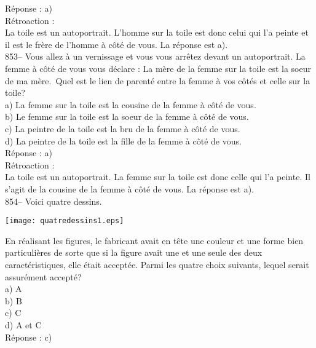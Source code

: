 ﻿\documentclass[letterpaper, 12pt]{article}
\begin{document}
R\'eponse : a)\\

R\'etroaction :\\
La toile est un autoportrait.  L'homme sur la toile est donc celui qui l'a
peinte et il est le fr\`ere de l'homme \`a c\^ot\'e de vous.  La r\'eponse
est a).\\

853-- Vous allez \`a un vernissage et vous vous arr\^etez devant un
autoportrait.  La femme \`a c\^ot\'e de vous vous d\'eclare : \og La
m\`ere de la femme sur la toile est la soeur de ma m\`ere.\fg\  Quel
est le lien de parent\'e entre la femme \`a vos c\^ot\'es et celle sur la toile?\\
a) La femme sur la toile est la cousine de la femme \`a c\^ot\'e de vous.\\
b) Le femme sur la toile est la soeur de la femme \`a c\^ot\'e de vous.\\
c) La peintre de la toile est la bru de la femme \`a c\^ot\'e de vous.\\
d) La peintre de la toile est la fille de la femme \`a c\^ot\'e de vous.\\

R\'eponse : a)\\

R\'etroaction : \\
La toile est un autoportrait.  La femme sur la toile est donc celle qui l'a
peinte.  Il s'agit de la cousine de la femme \`a c\^ot\'e de vous.  La
r\'eponse est a).\\

854-- Voici quatre dessins.
    \begin{center}
    \texttt{[image: quatredessins1.eps]}
    \end{center}

En r\'ealisant les figures, le fabricant avait en t\^ete une couleur et une
forme bien particuli\`eres de sorte que si la figure avait une et une seule
des deux caract\'eristiques, elle \'etait accept\'ee.  Parmi les quatre
choix suivants, lequel serait assur\'ement accept\'e?\\
a) A\\
b) B\\
c) C\\
d) A et C\\

R\'eponse : c)\\
\end{document}
